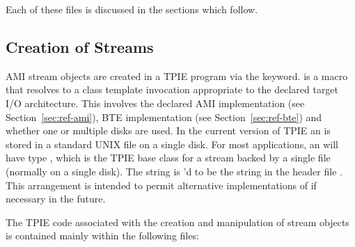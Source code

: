 Each of these files is discussed in the sections which
follow.

\subsection{Creation of Streams}

AMI stream objects are created in a TPIE program via the
 keyword.   is a macro
that resolves to a class template invocation appropriate to
the declared target I/O architecture. This involves the
declared AMI implementation (see Section~\ref{sec:ref-ami}),
BTE implementation (see
Section~\ref{sec:ref-bte}) and whether one or multiple disks
are used.  In the current version of TPIE an
 is stored in a standard UNIX file on a
single disk. For most applications, an 
will have type , which is the TPIE
base class for a stream backed by a single file (normally on
a single disk). The string  is
'd to be the string
 in the header file
. This arrangement is intended to permit
alternative implementations of  if
necessary in the future.

The TPIE code associated with the creation and manipulation
of stream objects is contained mainly within the following
files:

